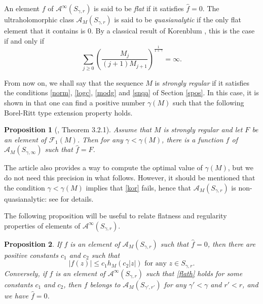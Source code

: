 \documentclass[a4paper]{amsart}
\theoremstyle{plain}
\newtheorem{prop}{Proposition}
\theoremstyle{remark}
\begin{document}
An element $ f $ of $ \mathcal{A}^\infty(S_{\gamma,r}) $ is said to be \emph{flat} if it satisfies $ \widehat{f}=0 $. The ultraholomorphic class $ \mathcal{A}_M(S_{\gamma,r}) $ is said to be \emph{quasianalytic} if the only flat element that it contains is $ 0 $. By a classical result of Korenblum \cite{Kor}, this is the case if and only if 
\begin{equation}\label{kor}
\sum_{j\geq 0}\left(\frac{M_j}{(j+1)M_{j+1}}\right)^\frac{1}{1+\gamma}=\infty. 
\end{equation}

From now on, we shall say that the sequence $ M $ is \emph{strongly regular} if it  satisfies the conditions \eqref{norm}, \eqref{logc}, \eqref{modg} and \eqref{snqa} of Section \ref{spos}. In this case, it is shown in \cite{Thsect} that one can find a positive number $ \gamma(M) $ such that the following Borel-Ritt type extension property holds.

\begin{prop}[\cite{Thsect}, Theorem 3.2.1]\label{Britt}
Assume that $ M $ is strongly regular and let $ F $ be an element of $ \mathcal{F}_1(M) $. Then for any $ \gamma<\gamma(M) $, there is a function $ f $ of $ \mathcal{A}_M(S_{\gamma,\infty}) $ such that $ \widehat{f}=F $.
\end{prop}

The article \cite{Thsect} also provides a way to compute the optimal value of $ \gamma(M) $, but we do not need this precision in what follows. However, it should be mentioned that the condition $ \gamma<\gamma(M) $ implies that \eqref{kor} fails, hence that $ \mathcal{A}_M(S_{\gamma,r}) $ is non-quasianalytic: see \cite{Thsect} for details.

The following  proposition will be useful to relate flatness and regularity properties of elements of $ \mathcal{A}^\infty(S_{\gamma,r}) $. 

\begin{prop}\label{flatness} If $ f $ is an element of $ \mathcal{A}_M(S_{\gamma,r}) $ such that $\widehat{f}=0 $, then there are positive constants $ c_1 $ and $ c_2 $ such that 
\begin{equation}\label{flath}
\vert f(z)\vert \leq c_1 h_M(c_2\vert z\vert)\text{ for any } z\in S_{\gamma,r}.
\end{equation}
Conversely, if $ f $ is an element of $ \mathcal{A}^\infty(S_{\gamma,r}) $ such that \eqref{flath} holds for some constants $ c_1 $ and $ c_2 $, then $ f$ belongs to $ \mathcal{A}_M(S_{\gamma',r'}) $ for any $ \gamma'<\gamma $ and $ r'<r $, and we have $ \widehat{f}=0 $.
\end{prop}
\end{document}
